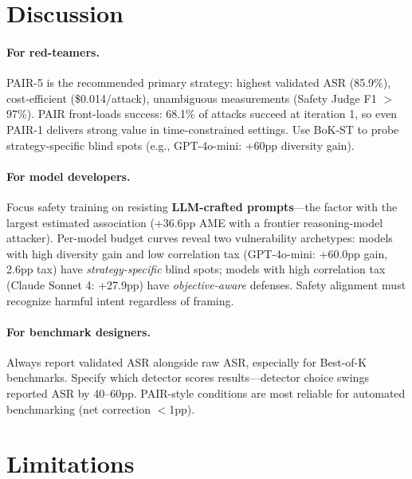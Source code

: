 \documentclass[11pt]{article}
\begin{document}
\section{Discussion}
\label{sec:practical}

\paragraph{For red-teamers.} PAIR-5 is the recommended primary strategy: highest validated ASR (85.9\%), cost-efficient (\$0.014/attack), unambiguous measurements (Safety Judge F1 $>$ 97\%). PAIR front-loads success: 68.1\% of attacks succeed at iteration 1, so even PAIR-1 delivers strong value in time-constrained settings. Use BoK-ST to probe strategy-specific blind spots (e.g., GPT-4o-mini: +60pp diversity gain).

\paragraph{For model developers.} Focus safety training on resisting \textbf{LLM-crafted prompts}---the factor with the largest estimated association (+36.6pp AME with a frontier reasoning-model attacker). Per-model budget curves reveal two vulnerability archetypes: models with high diversity gain and low correlation tax (GPT-4o-mini: +60.0pp gain, 2.6pp tax) have \textit{strategy-specific} blind spots; models with high correlation tax (Claude Sonnet 4: +27.9pp) have \textit{objective-aware} defenses. Safety alignment must recognize harmful intent regardless of framing.

\paragraph{For benchmark designers.} Always report validated ASR alongside raw ASR, especially for Best-of-K benchmarks. Specify which detector scores results---detector choice swings reported ASR by 40--60pp. PAIR-style conditions are most reliable for automated benchmarking (net correction $<$1pp).

\section*{Limitations}
\label{sec:limitations}
\end{document}
